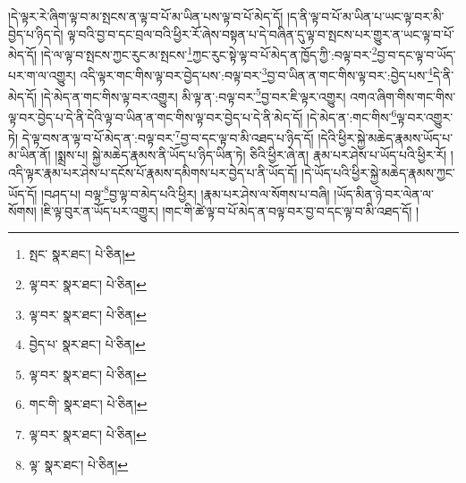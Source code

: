 །དེ་ལྟར་རེ་ཞིག་ལྟ་བ་མ་སྤངས་ན་ལྟ་བ་པོ་མ་ཡིན་པས་ལྟ་བ་པོ་མེད་དོ། །ད་ནི་ལྟ་བ་པོ་མ་ཡིན་པ་ཡང་ལྟ་བར་མི་བྱེད་པ་ཉིད་དེ། ལྟ་བའི་བྱ་བ་དང་བྲལ་བའི་ཕྱིར་རོ་ཞེས་བསྟན་པ་དེ་བཞིན་དུ་ལྟ་བ་སྤངས་པར་གྱུར་ན་ཡང་ལྟ་བ་པོ་མེད་དོ། །དེ་ལ་ལྟ་བ་སྤངས་ཀྱང་རུང་མ་སྤངས་\footnote{སྤང་  སྣར་ཐང་།  པེ་ཅིན། }ཀྱང་རུང་སྟེ་ལྟ་བ་པོ་མེད་ན་ཁྱོད་ཀྱི་:བལྟ་བར་\footnote{ལྟ་བར་  སྣར་ཐང་།  པེ་ཅིན། }བྱ་བ་དང་ལྟ་བ་ཡོད་པར་ག་ལ་འགྱུར། འདི་ལྟར་གང་གིས་ལྟ་བར་བྱེད་པས་:བལྟ་བར་\footnote{ལྟ་བར་  སྣར་ཐང་།  པེ་ཅིན། }བྱ་བ་ཡིན་ན་གང་གིས་ལྟ་བར་:བྱེད་པས་\footnote{བྱེད་པ་  སྣར་ཐང་།  པེ་ཅིན། }དེ་ནི་མེད་དོ། །དེ་མེད་ན་གང་གིས་ལྟ་བར་འགྱུར། མི་ལྟ་ན་:བལྟ་བར་\footnote{ལྟ་བར་  སྣར་ཐང་།  པེ་ཅིན། }བྱ་བར་ཇི་ལྟར་འགྱུར། འགའ་ཞིག་གིས་གང་གིས་ལྟ་བར་བྱེད་པ་དེ་ནི་དེའི་ལྟ་བ་ཡིན་ན་གང་གིས་ལྟ་བར་བྱེད་པ་དེ་ནི་མེད་དོ། །དེ་མེད་ན་:གང་གིས་\footnote{གང་གི་  སྣར་ཐང་།  པེ་ཅིན། }ལྟ་བར་འགྱུར་ཏེ། དེ་ལྟ་བས་ན་ལྟ་བ་པོ་མེད་ན་:བལྟ་བར་\footnote{ལྟ་བར་  སྣར་ཐང་།  པེ་ཅིན། }བྱ་བ་དང་ལྟ་བ་མི་འཐད་པ་ཉིད་དོ། །དེའི་ཕྱིར་སྐྱེ་མཆེད་རྣམས་ཡོད་པ་མ་ཡིན་ནོ། །སྨྲས་པ། སྐྱེ་མཆེད་རྣམས་ནི་ཡོད་པ་ཉིད་ཡིན་ཏེ། ཅིའི་ཕྱིར་ཞེ་ན། རྣམ་པར་ཤེས་པ་ཡོད་པའི་ཕྱིར་རོ། །འདི་ལྟར་རྣམ་པར་ཤེས་པ་དངོས་པོ་རྣམས་དམིགས་པར་བྱེད་པ་ནི་ཡོད་དོ། །དེ་ཡོད་པའི་ཕྱིར་སྐྱེ་མཆེད་རྣམས་ཀྱང་ཡོད་དོ། །བཤད་པ། བལྟ་\footnote{ལྟ་  སྣར་ཐང་།  པེ་ཅིན། }བྱ་ལྟ་བ་མེད་པའི་ཕྱིར། །རྣམ་པར་ཤེས་ལ་སོགས་པ་བཞི། །ཡོད་མིན་ཉེ་བར་ལེན་ལ་སོགས། །ཇི་ལྟ་བུར་ན་ཡོད་པར་འགྱུར། །གང་གི་ཚེ་ལྟ་བ་པོ་མེད་ན་བལྟ་བར་བྱ་བ་དང་ལྟ་བ་མི་འཐད་དོ། །
